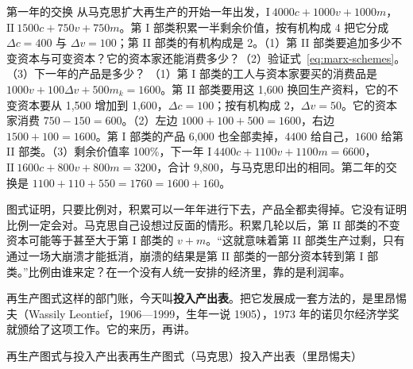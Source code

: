 \begin{example}{第一年的交换}\label{ex:marx-expanded}
从马克思扩大再生产的开始一年出发，$\text{I}\ 4000c+1000v+1000m$，$\text{II}\ 1500c+750v+750m$。第 I 部类积累一半剩余价值，按有机构成 4 把它分成 $\Delta c=400$ 与 $\Delta v=100$；第 II 部类的有机构成是 2。（1）第 II 部类要追加多少不变资本与可变资本？它的资本家还能消费多少？（2）验证式~\eqref{eq:marx-schemes}。（3）下一年的产品是多少？
\solution （1）第 I 部类的工人与资本家要买的消费品是 $1000v+100\Delta v+500m_k=1600$。第 II 部类要用这 1,600 换回生产资料，它的不变资本要从 1,500 增加到 1,600，$\Delta c=100$；按有机构成 2，$\Delta v=50$。它的资本家消费 $750-150=600$。（2）左边 $1000+100+500=1600$，右边 $1500+100=1600$。第 I 部类的产品 6,000 也全部卖掉，$4400$ 给自己，$1600$ 给第 II 部类。（3）剩余价值率 100\%，下一年 $\text{I}\ 4400c+1100v+1100m=6600$，$\text{II}\ 1600c+800v+800m=3200$，合计 9,800，与马克思印出的相同\cite{marx1909k2}。第二年的交换是 $1100+110+550=1760=1600+160$。
\end{example}


图式证明，只要比例对，积累可以一年年进行下去，产品全都卖得掉。它没有证明比例一定会对。马克思自己设想过反面的情形。积累几轮以后，第 II 部类的不变资本可能等于甚至大于第 I 部类的 $v+m$。“这就意味着第 II 部类生产过剩，只有通过一场大崩溃才能抵消，崩溃的结果是第 II 部类的一部分资本转到第 I 部类。”\cite{marx1909k2}比例由谁来定？在一个没有人统一安排的经济里，靠的是利润率。

再生产图式这样的部门账，今天叫\textbf{投入产出表}。把它发展成一套方法的，是里昂惕夫（Wassily Leontief，1906—1999，生年一说 1905），1973 年的诺贝尔经济学奖就颁给了这项工作\cite{nobel1973}。它的来历，再讲。

\begin{compare}{再生产图式与投入产出表}{再生产图式（马克思）}{投入产出表（里昂惕夫）}
\end{compare}

